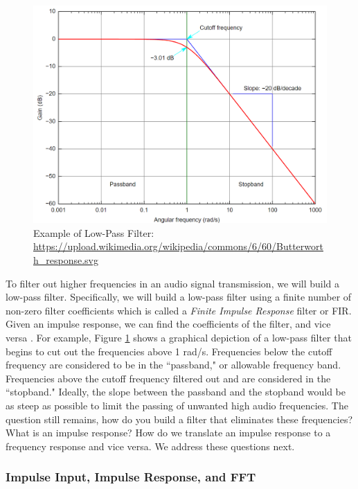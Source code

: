 \begin{figure}[h!]
	\centering
	\includegraphics[scale = .5]{images/low_pass.png} %
	\caption{Example of Low-Pass Filter: \url{https://upload.wikimedia.org/wikipedia/commons/6/60/Butterworth_response.svg}}
	\label{fig:lowpass}
\end{figure}    

To filter out higher frequencies in an audio signal
transmission, we will build a low-pass filter. Specifically, we
will build a low-pass filter using a finite number of non-zero
filter coefficients which is called a \textit{Finite Impulse
Response} filter or FIR. Given an impulse response, we can find
the coefficients of the filter, and vice versa
\cite{notes:class}. For example, Figure \ref{fig:lowpass} shows a
graphical depiction of a low-pass filter that begins to cut out
the frequencies above 1 rad/s. Frequencies below the cutoff
frequency are considered to be in the
``passband," or allowable frequency band.  Frequencies above the cutoff frequency filtered out and are considered in the ``stopband."
Ideally, the slope between the passband and the stopband would be
as steep as possible to limit the passing of unwanted high audio
frequencies. The question still remains, how do you build a
filter that eliminates these frequencies? What is an impulse
response? How do we translate an impulse response to a frequency
response and vice versa. We address these questions next.

\subsubsection{Impulse Input, Impulse Response, and FFT}

